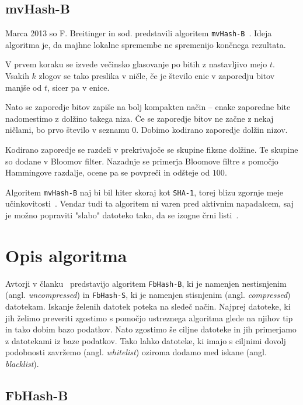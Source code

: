 \documentclass{acm_proc_article-sp}
\begin{document}
\subsection{mvHash-B}
Marca 2013 so F. Breitinger in sod. predstavili algoritem \texttt{mvHash-B}~\cite{mvhash-b}. Ideja algoritma je, da majhne lokalne spremembe ne spremenijo končnega rezultata. 

V prvem koraku se izvede večinsko glasovanje po bitih z nastavljivo mejo $t$. Vsakih $k$ zlogov se tako preslika v ničle, če je število enic v zaporedju bitov manjše od $t$, sicer pa v enice.

Nato se zaporedje bitov zapiše na bolj kompakten način -- enake zaporedne bite nadomestimo z dolžino takega niza. Če se zaporedje bitov ne začne z nekaj ničlami, bo prvo število v seznamu 0. Dobimo kodirano zaporedje dolžin nizov.

Kodirano zaporedje se razdeli v prekrivajoče se skupine fiksne dolžine. Te skupine so dodane v Bloomov filter.
Nazadnje se primerja Bloomove filtre s pomočjo Hammingove razdalje, ocene pa se povpreči in odšteje od $100$. 

Algoritem \texttt{mvHash-B} naj bi bil hiter skoraj kot \texttt{SHA-1}, torej blizu zgornje meje učinkovitosti~\cite{mvhash-b}. Vendar tudi ta algoritem ni varen pred aktivnim napadalcem, saj je možno popraviti "slabo" datoteko tako, da se izogne črni listi~\cite{chang2016security}.

\section{Opis algoritma}

Avtorji v članku~\cite{fbhash} predstavijo algoritem \texttt{FbHash-B}, ki je namenjen nestisnjenim (angl. \emph{uncompressed}) in \texttt{FbHash-S}, ki je namenjen stisnjenim (angl. \emph{compressed}) datotekam. Iskanje želenih datotek poteka na sledeč način. Najprej datoteke, ki jih želimo preveriti zgostimo s pomočjo ustreznega algoritma glede na njihov tip in tako dobim bazo podatkov. Nato zgostimo še ciljne datoteke in jih primerjamo z datotekami iz baze podatkov. Tako lahko datoteke, ki imajo s ciljnimi dovolj podobnosti zavržemo (angl. \emph{whitelist}) oziroma dodamo med iskane (angl. \emph{blacklist}).

\subsection{FbHash-B}
\end{document}
